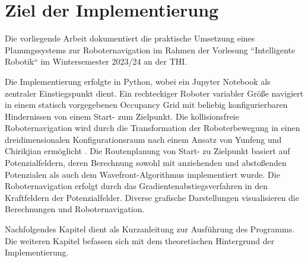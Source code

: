 \chapter{Ziel der Implementierung}

Die vorliegende Arbeit dokumentiert die praktische Umsetzung eines Planungssystems zur Roboternavigation im Rahmen der Vorlesung ``Intelligente Robotik`` im Wintersemester 2023/24 an der THI.

Die Implementierung erfolgte in Python, wobei ein Jupyter Notebook als zentraler Einstiegspunkt dient. 
Ein rechteckiger Roboter variabler Größe navigiert in einem statisch vorgegebenen Occupancy Grid mit beliebig konfigurierbaren Hindernissen von einem Start- zum Zielpunkt.
Die kollisionsfreie Roboternavigation wird durch die Transformation der Roboterbewegung in einen dreidimensionalen Konfigurationsraum nach einem Ansatz von Yunfeng und Chirikjian ermöglicht \cite{wang.2000}.
Die Routenplanung von Start- zu Zielpunkt basiert auf Potenzialfeldern, deren Berechnung sowohl mit anziehenden und abstoßenden Potenzialen als auch dem Wavefront-Algorithmus implementiert wurde. 
Die Roboternavigation erfolgt durch das Gradientenabstiegsverfahren in den Kraftfeldern der Potenzialfelder. 
Diverse grafische Darstellungen visualisieren die Berechnungen und Roboternavigation.

Nachfolgendes Kapitel dient als Kurzanleitung zur Ausführung des Programms. Die weiteren Kapitel befassen sich mit dem theoretischen Hintergrund der Implementierung.

%
